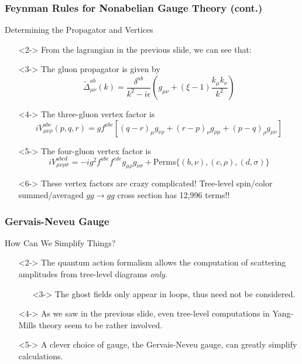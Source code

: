\documentclass{beamer}
\begin{document}
\begin{frame}
    \frametitle{Feynman Rules for Nonabelian Gauge Theory (cont.)}
    \alert{Determining the Propagator and Vertices}
    \begin{itemize}
        \item[\textbullet]<2-> From the lagrangian in the previous slide, we can see that:
        \item[\textbullet]<3-> The gluon propagator is given by \[ \tilde{\Delta}_{\mu\nu}^{ab}(k) = \frac{\delta^{ab}}{k^2 - i\epsilon}\left(g_{\mu\nu} + (\xi - 1)\frac{k_\mu k_\nu}{k^2}\right) \]
        \item[\textbullet]<4-> The three-gluon vertex factor is \[ iV_{\mu\nu\rho}^{abc}(p,q,r) = gf^{abc}\left[(q-r)_\mu g_{\nu\rho} + (r-p)_\nu g_{\rho\mu} + (p-q)_\rho g_{\mu\nu} \right] \] 
        \item[\textbullet]<5-> The four-gluon vertex factor is \[ iV_{\mu\nu\rho\sigma}^{abcd} = -ig^2f^{abe}f^{cde}g_{\mu\rho}g_{\nu\sigma} + \text{Perms}\{(b,\nu), (c,\rho), (d,\sigma)\} \] 
        \item[\textbullet]<6-> These vertex factors are crazy complicated! Tree-level spin/color summed/averaged $gg\to gg$ cross section has 12,996 terms!!
    \end{itemize}
\end{frame}

\begin{frame}
    \frametitle{Gervais-Neveu Gauge}
    \alert{How Can We Simplify Things?}
    \begin{itemize}
        \item[\textbullet]<2-> The quantum action formalism allows the computation of scattering amplitudes from tree-level diagrams \textit{only}.
        \begin{itemize}
            \item[\textbullet]<3-> The ghost fields only appear in loops, thus need not be considered.
        \end{itemize}
        \item[\textbullet]<4-> As we saw in the previous slide, even tree-level computations in Yang-Mills theory seem to be rather involved.
        \item[\textbullet]<5-> A clever choice of gauge, the Gervais-Neveu gauge, can greatly simplify calculations.
    \end{itemize}
\end{frame}
\end{document}
